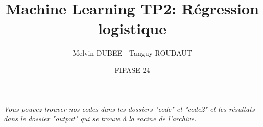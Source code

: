 \documentclass{styles/articleEnsta}
\title{Machine Learning TP2: Régression logistique}
\author{Melvin DUBEE - Tanguy ROUDAUT \and FIPASE 24}
\begin{document}
\maketitle

\textit{Vous pouvez trouver nos codes dans les dossiers "code" et "code2" et les résultats dans le dossier "output" qui se trouve à la racine de l'archive.}





\end{document}
